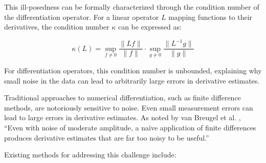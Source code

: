 \documentclass[10pt,journal,compsoc]{IEEEtran}
\begin{document}
This ill-posedness can be formally characterized through the condition number of the differentiation operator. For a linear operator $L$ mapping functions to their derivatives, the condition number $\kappa$ can be expressed as:

\begin{equation}
\kappa(L) = \sup_{f \neq 0} \frac{\|Lf\|}{\|f\|} \cdot \sup_{g \neq 0} \frac{\|L^{-1}g\|}{\|g\|}
\end{equation}

For differentiation operators, this condition number is unbounded, explaining why small noise in the data can lead to arbitrarily large errors in derivative estimates.

Traditional approaches to numerical differentiation, such as finite difference methods, are notoriously sensitive to noise. Even small measurement errors can lead to large errors in derivative estimates. As noted by van Breugel et al. \cite{van2021numerical}, ``Even with noise of moderate amplitude, a naïve application of finite differences produces derivative estimates that are far too noisy to be useful.''

Existing methods for addressing this challenge include:
\end{document}

